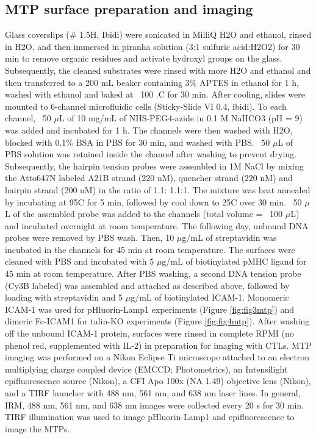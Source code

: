 \subsection{MTP surface preparation and imaging}
Glass coverslips (\# 1.5H, Ibidi) were sonicated in MilliQ H2O and ethanol, rinsed in H2O, and then immersed in piranha solution (3:1 sulfuric acid:H2O2) for 30 min to remove organic residues and activate hydroxyl groups on the glass. Subsequently, the cleaned substrates were rinsed with more H2O and ethanol and then transferred to a 200 mL beaker containing 3\% APTES in ethanol for 1 h, washed with ethanol and baked at ~100 .C for 30 min. After cooling, slides were mounted to 6-channel microfluidic cells (Sticky-Slide VI 0.4, ibidi). To each channel, ~50 $\mu$L of 10 mg/mL of NHS-PEG4-azide in 0.1 M NaHCO3 (pH = 9) was added and incubated for 1 h. The channels were then washed with H2O, blocked with 0.1\% BSA in PBS for 30 min, and washed with PBS. ~50 $\mu$L of PBS solution was retained inside the channel after washing to prevent drying. Subsequently, the hairpin tension probes were assembled in 1M NaCl by mixing the Atto647N labeled A21B strand (220 nM), quencher strand (220 nM) and hairpin strand (200 nM) in the ratio of 1.1: 1.1:1. The mixture was heat annealed by incubating at 95\degree C for 5 min, followed by cool down to 25\degree C over 30 min. ~50 $\mu$L of the assembled probe was added to the channels (total volume = ~100 $\mu$L) and incubated overnight at room temperature. The following day, unbound DNA probes were removed by PBS wash. Then, 10 $\mu$g/mL of streptavidin was incubated in the channels for 45 min at room temperature. The surfaces were cleaned with PBS and incubated with 5 $\mu$g/mL of biotinylated pMHC ligand for 45 min at room temperature. After PBS washing, a second DNA tension probe (Cy3B labeled) was assembled and attached as described above, followed by loading with streptavidin and 5 $\mu$g/mL of biotinylated ICAM-1. Monomeric ICAM-1 was used for pHluorin-Lamp1 experiments (Figure \ref{fig:fig3mtp}) and dimeric Fc-ICAM1 for talin-KO experiments (Figure \ref{fig:fig4mtp}). After washing off the unbound ICAM-1 protein, surfaces were rinsed in complete RPMI (no phenol red, supplemented with IL-2) in preparation for imaging with CTLs. MTP imaging was performed on a Nikon Eclipse Ti microscope attached to an electron multiplying charge coupled device (EMCCD; Photometrics), an Intensilight epifluorescence source (Nikon), a CFI Apo 100x (NA 1.49) objective lens (Nikon), and a TIRF launcher with 488 nm, 561 nm, and 638 nm laser lines. In general, IRM, 488 nm, 561 nm, and 638 nm images were collected every 20 s for 30 min. TIRF illumination was used to image pHluorin-Lamp1 and epifluorescence to image the MTPs.

